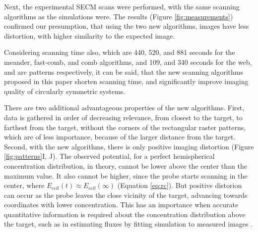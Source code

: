 \documentclass[3p]{elsarticle}
\begin{document}
Next, the experimental SECM scans were performed, with the same scanning algorithms as the simulations were. The results (Figure \ref{fig:measurements}) confirmed our presumption, that using the two new algorithms, images have less distortion, with higher similarity to the expected image.

Considering scanning time also, which are 440, 520, and 881 seconds for the meander, fast-comb, and comb algorithms, and 109, and 340 seconds for the web, and arc patterns respectively, it can be said, that the new scanning algorithms proposed in this paper shorten scanning time, and significantly improve imaging quality of circularly symmetric systems. 

There are two additional advantageous properties of the new algorithms. First, data is gathered in order of decreasing relevance, from closest to the target, to farthest from the target, without the corners of the rectangular raster patterns, which are of less importance, because of the larger distance from the target. Second, with the new algorithms, there is only positive imaging distortion (Figure \ref{fig:patterns}I, J). The observed potential, for a perfect hemispherical concentration distribution, in theory, cannot be lower above the center than the maximum value. It also cannot be higher, since the probe starts scanning in the center, where $E_{cell}(t) \approx E_{cell}(\infty)$ (Equation \ref{eq:rc}). But positive distorion can occur as the probe leaves the close vicinity of the target, advancing towards coordinates with lower concentration. This has an importance when accurate quantitative information is required about the concentration distribution above the target, such as in estimating fluxes by fitting simulation to measured images \cite{ach, co2}.
\end{document}
